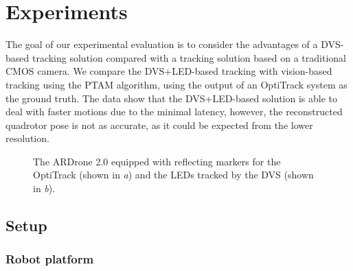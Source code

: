 
\section{Experiments\label{sec:experiments}}

The goal of our experimental evaluation is to consider the advantages
of a DVS-based tracking solution compared with a tracking solution
based on a traditional CMOS camera. We compare the DVS+LED-based tracking
with vision-based tracking using the PTAM algorithm, using the output
of an OptiTrack system as the ground truth. The data show that the
DVS+LED-based solution is able to deal with faster motions due to
the minimal latency, however, the reconstructed quadrotor pose is
not as accurate, as it could be expected from the lower resolution. 



\begin{figure}[b]
\centering{}\hfill{}\hfill{}\hfill{}
\caption{\label{fig:marked_quadrotor}The ARDrone 2.0 equipped with reflecting
markers for the OptiTrack (shown in \emph{a}) and the LEDs tracked
by the DVS (shown in \emph{b}). }
\end{figure}



\subsection{Setup}


\subsubsection{Robot platform}

